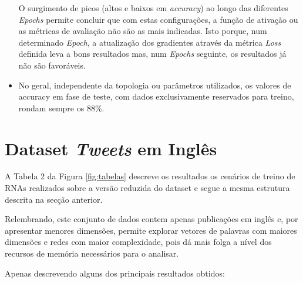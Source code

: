 \begin{itemize}
    O surgimento de picos (altos e baixos em \textit{accuracy}) ao longo das diferentes \textit{Epochs} permite concluir que com estas configurações, a função de ativação ou as métricas de avaliação não são as mais indicadas. 
    Isto porque, num determinado \textit{Epoch}, a atualização dos gradientes através da métrica \textit{Loss} definida leva a bons resultados mas, num \textit{Epochs} seguinte, os resultados já não são favoráveis. 
    
    \item No geral, independente da topologia ou parâmetros utilizados, os valores de accuracy em fase de teste, com dados exclusivamente reservados para treino, rondam sempre os 88\%. 
\end{itemize}
    

\section{Dataset \textit{Tweets} em Inglês}

A Tabela 2 da Figura \ref{fig:tabelas} descreve os resultados os cenários de treino de RNAs realizados sobre a versão reduzida do dataset e segue a mesma estrutura descrita na secção anterior.

Relembrando, este conjunto de dados contem apenas publicações em inglês e, por apresentar menores dimensões, permite explorar vetores de palavras com maiores dimensões e redes com maior complexidade, pois dá mais folga a nível dos recursos de memória necessários para o analisar.

Apenas descrevendo alguns dos principais resultados obtidos: 

